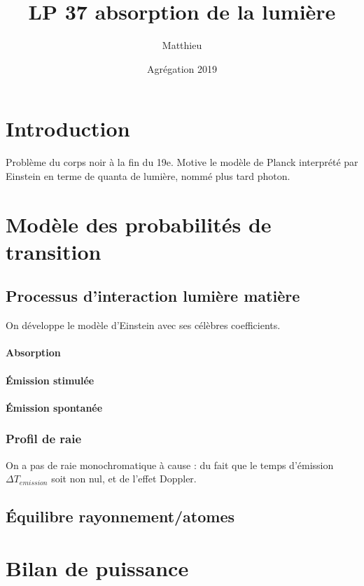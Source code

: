 \documentclass[12pt,prb,aps,epsf]{article}
\begin{document}
	
	\title{LP 37 absorption de la lumière}
		\author{Matthieu}
		\date{Agrégation 2019}
		
	\maketitle
	
	\tableofcontents
	
	\pagebreak

\section*{Introduction}
Problème du corps noir à la fin du 19e. Motive le modèle de Planck interprété par Einstein en terme de quanta de lumière, nommé plus tard photon.

\section{Modèle des probabilités de transition}
\subsection{Processus d'interaction lumière matière}
On développe le modèle d'Einstein avec ses célèbres coefficients.
\paragraph{Absorption}
\paragraph{Émission stimulée}
\paragraph{Émission spontanée}
\subsubsection{Profil de raie}
On a pas de raie monochromatique à cause : du fait que le temps d'émission $\Delta T_{emission}$ soit non nul, et de l'effet Doppler.

\subsection{Équilibre rayonnement/atomes}

\section{Bilan de puissance}
\end{document}
